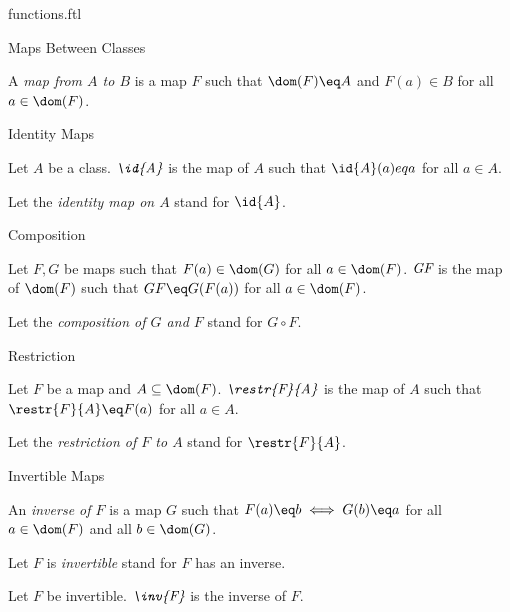 \documentclass{naproche-library}
\begin{document}
\begin{smodule}[title=Functions and Maps]{functions.ftl}
\begin{sfragment}{Maps Between Classes}
  \begin{definition*}[forthel,id=MapFromToDef]
    A \emph{map from $A$ to $B$} is a map $F$ such that $\dom(F)\eq A$ and $F(a)\in B$ for all $a\in\dom(F)$.
  \end{definition*}
\end{sfragment}

\begin{sfragment}{Identity Maps}
  \begin{definition*}[forthel,id=IdentityMapDef]
    Let $A$ be a class.
    $\emph{\id{A}}$ is the map of $A$ such that $\id{A}(a)eq a$ for all $a\in A$.

    Let the \emph{identity map on $A$} stand for $\id{A}$.
  \end{definition*}
\end{sfragment}

\begin{sfragment}{Composition}
  \begin{definition*}[forthel,id=CompositionDef]
    Let $F,G$ be maps such that $F(a)\in\dom(G)$ for all $a\in\dom(F)$.
    $\emph{G\circ F}$ is the map of $\dom(F)$ such that $G\circ F\eq G(F(a))$ for all $a\in\dom(F)$.

    Let the \emph{composition of $G$ and $F$} stand for $G\circ F$.
  \end{definition*}
\end{sfragment}

\begin{sfragment}{Restriction}
  \begin{definition*}[forthel,id=RestrictionDef]
    Let $F$ be a map and $A\subseteq\dom(F)$.
    $\emph{\restr{F}{A}}$ is the map of $A$ such that $\restr{F}{A}\eq F(a)$ for all $a\in A$.

    Let the \emph{restriction of $F$ to $A$} stand for $\restr{F}{A}$.
  \end{definition*}
\end{sfragment}

\begin{sfragment}{Invertible Maps}
  \begin{definition*}[forthel,id=InvertibleDef]
    An \emph{inverse of $F$} is a map $G$ such that $F(a)\eq b\iff G(b)\eq a$ for all $a\in\dom(F)$ and all $b\in\dom(G)$.

    Let $F$ is \emph{invertible} stand for $F$ has an inverse.
  \end{definition*}

  \begin{definition*}[forthel,id=InverseMapDef]
    Let $F$ be invertible.
    $\emph{\inv{F}}$ is the inverse of $F$.
  \end{definition*}
\end{sfragment}


\end{smodule}
\end{document}
